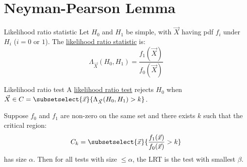 \documentclass[../Main.tex]{subfiles}
\begin{document}
\section{Neyman-Pearson Lemma}
\begin{definition}{Likelihood ratio statistic}
    Let $H_0$ and $H_1$ be simple, with $\vec{X}$ having pdf $f_i$ under $H_i$ ($i = 0$ or $1$). The \underline{likelihood ratio statistic} is:
    \begin{equation*}
        \Lambda_{\vec{X}}(H_0, H_1) = \frac{f_1(\vec{X})}{f_0(\vec{X})}
    \end{equation*}
\end{definition}
\begin{definition}{Likelihood ratio test}
    A \underline{likelihood ratio test} rejects $H_0$ when $\vec{X} \in C = \subsetselect{\vec{x}}{\Lambda_{\vec{X}}(H_0, H_1) > k}$.
\end{definition}
\begin{theorem}
    Suppose $f_0$ and $f_1$ are non-zero on the same set and there exists $k$ such that the critical region:
    \begin{equation*}
        C_k = \subsetselect{\vec{x}}{\frac{f_1(\vec{x})}{f_0(\vec{x})} > k}
    \end{equation*}
    has size $\alpha$. Then for all tests with size $\leq \alpha$, the LRT is the test with smallest $\beta$.
    \label{thmNeymanPearson}
\end{theorem}
\end{document}
